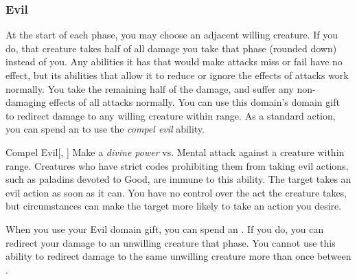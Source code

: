         \subsubsection{Evil}
             At the start of each phase, you may choose an adjacent willing creature.
            If you do, that creature takes half of all damage you take that phase (rounded down) instead of you.
            Any abilities it has that would make attacks miss or fail have no effect, but its abilities that allow it to reduce or ignore the effects of attacks work normally.
            You take the remaining half of the damage, and suffer any non-damaging effects of all attacks normally.
             You can use this domain's domain gift to redirect damage to any willing creature within \rngclose range.
             As a standard action, you can spend an  to use the \textit{compel evil} ability.
            \begin{ability}{Compel Evil}[, ]
                Make a \textit{divine power} vs. Mental attack against a creature within \rngmed range.
                Creatures who have strict codes prohibiting them from taking evil actions, such as paladins devoted to Good, are immune to this ability.
                \hit The target takes an evil action as soon as it can.
                You have no control over the act the creature takes, but circumstances can make the target more likely to take an action you desire.
            \end{ability}
             When you use your Evil domain gift, you can spend an .
            If you do, you can redirect your damage to an unwilling creature that phase.
            You cannot use this ability to redirect damage to the same unwilling creature more than once between .

